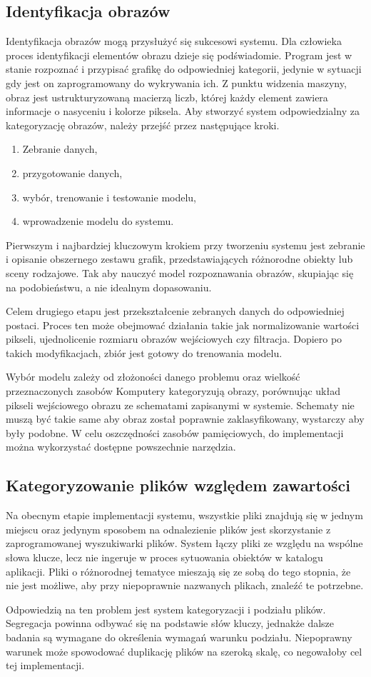 \documentclass[12pt,a4paper,twoside]{article}
\begin{document}
\subsection{Identyfikacja obrazów}
Identyfikacja obrazów mogą przysłużyć się sukcesowi systemu. Dla człowieka proces identyfikacji elementów obrazu dzieje się podświadomie.  Program jest w stanie rozpoznać i przypisać grafikę do odpowiedniej kategorii, jedynie w sytuacji gdy jest on zaprogramowany do wykrywania ich. Z punktu widzenia maszyny, obraz jest ustrukturyzowaną macierzą liczb, której każdy element zawiera informacje o nasyceniu i kolorze piksela. Aby stworzyć system odpowiedzialny za kategoryzację obrazów, należy przejść przez następujące kroki.
\begin{enumerate}
	\item Zebranie danych,
	\item przygotowanie danych,
	\item wybór, trenowanie i testowanie modelu,
	\item wprowadzenie modelu do systemu.
\end{enumerate}
Pierwszym i najbardziej kluczowym krokiem przy tworzeniu systemu jest zebranie i opisanie obszernego zestawu grafik, przedstawiających różnorodne obiekty lub sceny rodzajowe. Tak aby nauczyć model rozpoznawania obrazów, skupiając się na podobieństwu, a nie idealnym dopasowaniu. \par
Celem drugiego etapu jest przekształcenie zebranych danych do odpowiedniej postaci. Proces ten może obejmować działania takie jak normalizowanie wartości pikseli, ujednolicenie rozmiaru obrazów wejściowych czy filtracja. Dopiero po takich modyfikacjach, zbiór jest gotowy do trenowania modelu.\par
Wybór modelu zależy od złożoności danego problemu oraz wielkość przeznaczonych zasobów 
Komputery kategoryzują obrazy, porównując układ pikseli wejściowego obrazu ze schematami zapisanymi w systemie. Schematy nie muszą być takie same aby obraz został poprawnie zaklasyfikowany, wystarczy aby były podobne. W celu oszczędności zasobów pamięciowych, do implementacji można wykorzystać dostępne powszechnie narzędzia. 
\subsection{Kategoryzowanie plików względem zawartości}
Na obecnym etapie implementacji systemu, wszystkie pliki znajdują się w jednym miejscu oraz jedynym sposobem na odnalezienie plików jest skorzystanie z zaprogramowanej wyszukiwarki plików. System łączy pliki ze względu na wspólne słowa klucze, lecz nie ingeruje w proces sytuowania obiektów w katalogu aplikacji. Pliki o różnorodnej tematyce mieszają się ze sobą do tego stopnia, że nie jest możliwe, aby przy niepoprawnie nazwanych plikach, znaleźć te potrzebne. \par
Odpowiedzią na ten problem jest system kategoryzacji i podziału plików. Segregacja powinna odbywać się na podstawie słów kluczy, jednakże dalsze badania są wymagane do określenia wymagań warunku podziału. Niepoprawny warunek może spowodować duplikację plików na szeroką skalę, co negowałoby cel tej implementacji.
\end{document}
